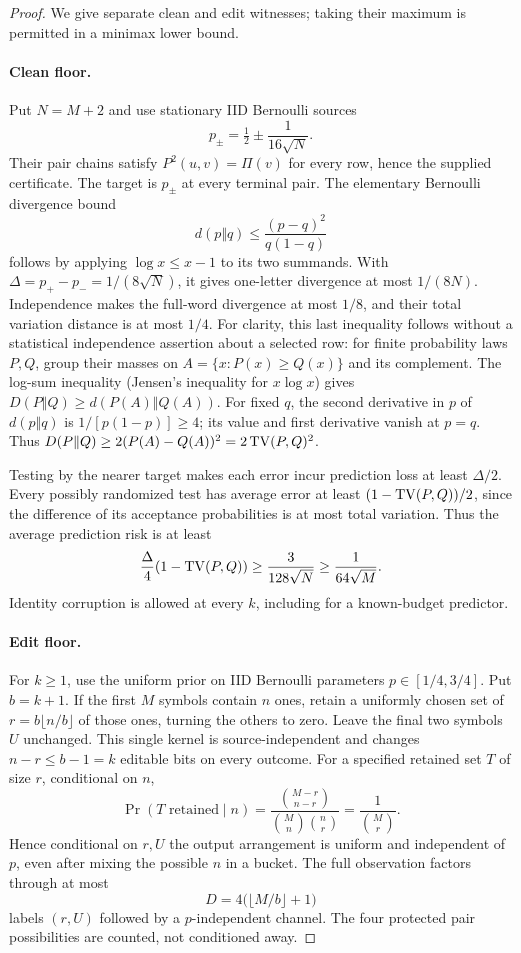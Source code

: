 \begin{proof}
We give separate clean and edit witnesses; taking their maximum is
permitted in a minimax lower bound.

\paragraph{Clean floor.}
Put $N=M+2$ and use stationary IID Bernoulli sources
\[
 p_\pm=\tfrac12\pm\frac1{16\sqrt N}.
\]
Their pair chains satisfy $P^2(u,v)=\Pi(v)$ for every row, hence the
supplied certificate. The target is $p_\pm$ at every terminal pair.
The elementary Bernoulli divergence bound
\[
 d(p\Vert q)\le\frac{(p-q)^2}{q(1-q)}
\]
follows by applying $\log x\le x-1$ to its two summands.
With $\Delta=p_+-p_-=1/(8\sqrt N)$, it gives one-letter divergence
at most $1/(8N)$. Independence makes the full-word divergence at most
$1/8$, and their total variation distance is at most $1/4$.
For clarity, this last inequality follows without a statistical
independence assertion about a selected row: for finite probability
laws $P,Q$, group their masses on
$A=\{x:P(x)\ge Q(x)\}$ and its complement. The log-sum inequality
(Jensen's inequality for $x\log x$) gives
$D(P\Vert Q)\ge d(P(A)\Vert Q(A))$.
For fixed $q$, the second derivative in $p$ of $d(p\Vert q)$ is
$1/[p(1-p)]\ge4$; its value and first derivative vanish at $p=q$.
Thus $D(P\Vert Q)\ge2(P(A)-Q(A))^2=2\operatorname{TV}(P,Q)^2$.

Testing by the nearer target makes each error incur prediction loss
at least $\Delta/2$. Every possibly randomized test has average error
at least $(1-\operatorname{TV}(P,Q))/2$, since the difference of its acceptance
probabilities is at most total variation. Thus the average prediction
risk is at least
\[
 \frac\Delta4(1-\operatorname{TV}(P,Q))
 \ge\frac3{128\sqrt N}\ge\frac1{64\sqrt M}.
\]
Identity corruption is allowed at every $k$, including for a
known-budget predictor.

\paragraph{Edit floor.}
For $k\ge1$, use the uniform prior on IID Bernoulli parameters
$p\in[1/4,3/4]$. Put $b=k+1$. If the first $M$ symbols contain $n$
ones, retain a uniformly chosen set of
$r=b\lfloor n/b\rfloor$ of those ones, turning the others to zero.
Leave the final two symbols $U$ unchanged. This single kernel is
source-independent and changes $n-r\le b-1=k$ editable bits on every
outcome.
For a specified retained set $T$ of size $r$, conditional on $n$,
\[
 \Pr(T\text{ retained}\mid n)
 =\frac{\binom{M-r}{n-r}}
        {\binom Mn\binom nr}
 =\frac1{\binom Mr}.
\]
Hence conditional on $r,U$ the output arrangement is uniform and
independent of $p$, even after mixing the possible $n$ in a bucket.
The full observation factors through at most
\[
 D=4\bigl(\lfloor M/b\rfloor+1\bigr)
\]
labels $(r,U)$ followed by a $p$-independent channel. The four protected
pair possibilities are counted, not conditioned away.


\end{proof}
